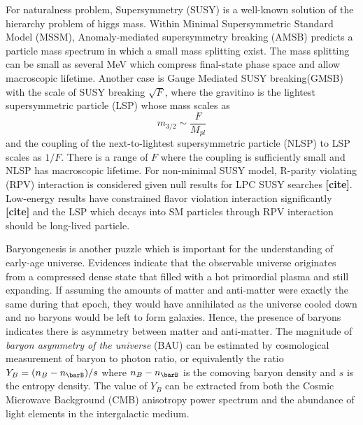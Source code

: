 For naturalness problem, Supersymmetry (SUSY) is a well-known solution of the hierarchy problem of higgs mass. Within Minimal Supersymmetric Standard Model (MSSM), Anomaly-mediated supersymmetry breaking (AMSB) predicts a particle mass spectrum in which a small mass splitting exist. The mass splitting can be small as several MeV which compress final-state phase space and allow  macroscopic lifetime. Another case is  Gauge Mediated SUSY breaking(GMSB) with the scale of SUSY breaking $\sqrt{F}$, where the gravitino is the lightest supersymmetric particle (LSP) whose mass scales as 
\begin{equation}
    m_{3/2} \sim \frac{F}{M_{pl}}
\end{equation}
and the coupling of the next-to-lightest supersymmetric particle (NLSP) to LSP scales as $1/F$. There is a range of $F$ where the coupling is sufficiently small and NLSP has macroscopic lifetime. For non-minimal SUSY model, R-parity violating (RPV) interaction is considered given null results for LPC SUSY searches \textbf{[cite]}. Low-energy results have constrained flavor violation interaction significantly \textbf{[cite]} and the LSP which decays into SM particles through RPV interaction should be long-lived particle. 

\iffalse
In the QCD sector, another naturalness concern is the Strong CP problem \textbf{[cite]}, the gauge invariance allows CP-odd term: 
\begin{equation}
    \mathcal{L}_{\theta} = \theta \frac{g^{2}_{S}}{32\pi^{2}}G^{a}_{\mu\nu}\tilde{G}^{\mu\nu}_{a}
\end{equation}
while $\theta$ is a dimensionless parameter. The actual value of $\theta$ is extremely close to zero, $|\theta|< 10^{-10}$, with measurements of nucleon electric dipole moments. By introducing an axion which is a Goldstone boson of a QCD-anomalous Peccei-Quinn (PQ) symmetry \textbf{[cite]}, small $\theta$ value can be explained.
\fi

Baryongenesis is another puzzle which is important for the understanding of early-age universe. Evidences indicate that the observable universe originates from a compressed dense state that filled with a hot primordial plasma and still expanding. If assuming the amounts of matter and anti-matter were exactly the same during that epoch, they would have annihilated as the universe cooled down and no baryons would be left to form galaxies. Hence, the presence of baryons indicates there is asymmetry between matter and anti-matter. The magnitude of \textit{baryon asymmetry of the universe} (BAU) can be estimated by cosmological measurement of baryon to photon ratio, or equivalently the ratio $Y_B = (n_B-n_{\barB})/s$ where $n_B-n_{\barB}$ is the comoving baryon density and $s$ is the entropy density. The value of $Y_B$ can be extracted from both the Cosmic Microwave Background (CMB) anisotropy power spectrum and the abundance of light elements in the intergalactic medium. 